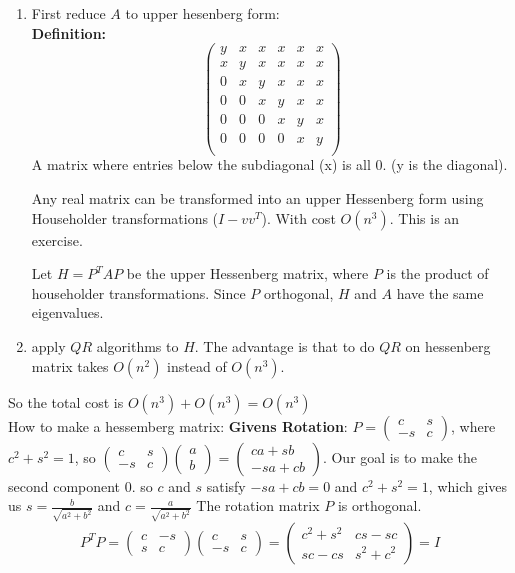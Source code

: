 \begin{enumerate}
\item 

First reduce $A$ to upper hesenberg form:\\
\textbf{Definition:} $$
\begin{pmatrix}
  y & x & x & x & x & x\\
  x & y & x & x & x & x\\
  0 & x & y & x & x & x\\
  0 & 0 & x & y & x & x\\
  0 & 0 & 0 & x & y & x\\
  0 & 0 & 0 & 0 & x & y\\
\end{pmatrix}$$
A matrix where entries below the subdiagonal (x) is all 0. (y is the
diagonal).

Any real matrix can be transformed into an upper Hessenberg form using
Householder transformations ($I-vv^T$). With cost $O(n^3)$. This is an exercise.

Let $H=P^TAP$ be the upper Hessenberg matrix, where $P$ is the product
of householder transformations. Since $P$ orthogonal, $H$ and $A$
have the same eigenvalues.
\item apply $QR$ algorithms to $H$. The advantage is that to do $QR$
  on hessenberg matrix takes $O(n^2)$ instead of $O(n^3)$. 
\end{enumerate}
So the total cost is $O(n^3) + O(n^3)= O(n^3)$\\

How to make a hessemberg matrix:
\textbf{Givens Rotation}:
$P = 
\begin{pmatrix}
  c&s\\-s & c
\end{pmatrix}
$, where $c^2+s^2=1$, so $\begin{pmatrix}
  c&s\\-s & c
\end{pmatrix}
\begin{pmatrix}
  a\\b
\end{pmatrix}=
\begin{pmatrix}
  ca+sb \\-sa+cb
\end{pmatrix}
$. Our goal is to make the second component 0.
so $c$ and $s$ satisfy $-sa+cb = 0$ and $c^2+s^2=1$, which gives us
$s=\frac{b}{\sqrt{a^2+b^2}}$
and $c=\frac{a}{\sqrt{a^2+b^2}}$
The rotation matrix $P$ is orthogonal. $$P^TP = \begin{pmatrix}
  c&-s\\s & c
\end{pmatrix}\begin{pmatrix}
  c&s\\-s & c
\end{pmatrix}=
\begin{pmatrix}
  c^2+s^2& cs-sc\\ sc-cs & s^2+c^2
\end{pmatrix} = I$$

